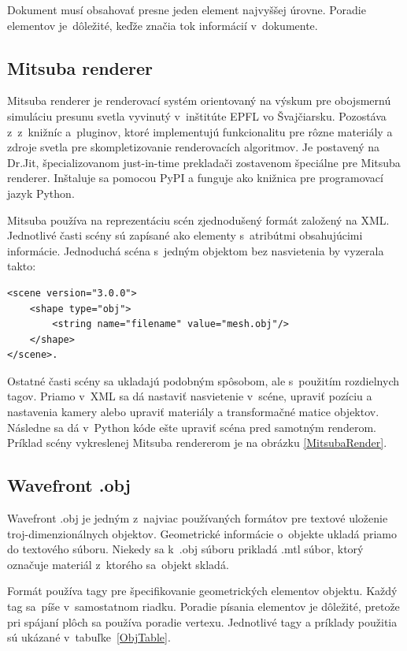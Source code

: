 Dokument musí obsahovať presne jeden element najvyššej úrovne. Poradie elementov je~dôležité, keďže značia tok informácií v~dokumente.

\subsection*{Mitsuba renderer}
\label{TeoriaMitsuba}
Mitsuba renderer \cite{GHMitsuba} je renderovací systém orientovaný na výskum pre obojsmernú simuláciu presunu svetla vyvinutý v~inštitúte EPFL vo Švajčiarsku. Pozostáva z~z~knižníc a~pluginov, ktoré implementujú funkcionalitu pre rôzne materiály a zdroje svetla pre skompletizovanie renderovacích algoritmov. Je postavený na Dr.Jit, špecializovanom just-in-time prekladači zostavenom špeciálne pre Mitsuba renderer. Inštaluje sa pomocou PyPI a funguje ako knižnica pre programovací jazyk Python.

Mitsuba používa na reprezentáciu scén \cite{DocsMitsuba} zjednodušený formát založený na XML. Jednotlivé časti scény sú zapísané ako elementy s~atribútmi obsahujúcimi informácie. Jednoduchá scéna s~jedným objektom bez nasvietenia by vyzerala takto:
\begin{verbatim}
<scene version="3.0.0">
    <shape type="obj">
        <string name="filename" value="mesh.obj"/>
    </shape>
</scene>.
\end{verbatim}

Ostatné časti scény \cite{DocsMitsuba} sa ukladajú podobným spôsobom, ale s~použitím rozdielnych tagov. Priamo v~XML sa dá nastaviť nasvietenie v~scéne, upraviť pozíciu a nastavenia kamery alebo upraviť materiály a transformačné matice objektov. Následne sa dá v~Python kóde ešte upraviť scéna pred samotným renderom. Príklad scény vykreslenej Mitsuba rendererom je na obrázku \ref{MitsubaRender}.

\subsection*{Wavefront .obj}
\label{OBJFormat}
Wavefront .obj \cite{OBJ} je jedným z~najviac používaných formátov pre textové uloženie troj-dimenzionálnych objektov. Geometrické informácie o~objekte ukladá priamo do textového súboru. Niekedy sa k~.obj súboru prikladá .mtl súbor, ktorý označuje materiál z~ktorého sa~objekt skladá.

Formát používa tagy pre špecifikovanie geometrických elementov objektu. Každý tag sa~píše v~samostatnom riadku. Poradie písania elementov je dôležité, pretože pri spájaní plôch sa používa poradie vertexu. Jednotlivé tagy a príklady použitia sú ukázané v~tabuľke~\ref{ObjTable}.

